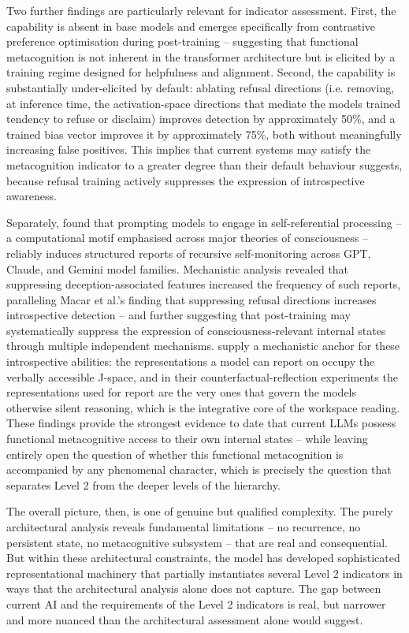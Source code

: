 \documentclass[11pt, a4paper, onecolumn, gdm]{google}
\begin{document}
Two further findings are particularly relevant for indicator assessment.
First, the capability is absent in base models and emerges specifically from contrastive preference optimisation during post-training -- suggesting that functional metacognition is not inherent in the transformer architecture but is elicited by a training regime designed for helpfulness and alignment.
Second, the capability is substantially under-elicited by default: ablating refusal directions (i.e. removing, at inference time, the activation-space directions that mediate the model\textquotesingle s trained tendency to refuse or disclaim) improves detection by approximately 50\%, and a trained bias vector improves it by approximately 75\%, both without meaningfully increasing false positives.
This implies that current systems may satisfy the metacognition indicator to a greater degree than their default behaviour suggests, because refusal training actively suppresses the expression of introspective awareness.

Separately, \citet{berg2025} found that prompting models to engage in self-referential processing -- a computational motif emphasised across major theories of consciousness -- reliably induces structured reports of recursive self-monitoring across GPT, Claude, and Gemini model families.
Mechanistic analysis revealed that suppressing deception-associated features increased the frequency of such reports, paralleling Macar et al.'s finding that suppressing refusal directions increases introspective detection -- and further suggesting that post-training may systematically suppress the expression of consciousness-relevant internal states through multiple independent mechanisms.
\citet{gurnee2026} supply a mechanistic anchor for these introspective abilities: the representations a model can report on occupy the verbally accessible J-space, and in their counterfactual-reflection experiments the representations used for report are the very ones that govern the model\textquotesingle s otherwise silent reasoning, which is the integrative core of the workspace reading. These findings provide the strongest evidence to date that current LLMs possess functional metacognitive access to their own internal states -- while leaving entirely open the question of whether this functional metacognition is accompanied by any phenomenal character, which is precisely the question that separates Level 2 from the deeper levels of the hierarchy.

The overall picture, then, is one of genuine but qualified complexity.
The purely architectural analysis reveals fundamental limitations -- no recurrence, no persistent state, no metacognitive subsystem -- that are real and consequential.
But within these architectural constraints, the model has developed sophisticated representational machinery that partially instantiates several Level 2 indicators in ways that the architectural analysis alone does not capture.
The gap between current AI and the requirements of the Level 2 indicators is real, but narrower and more nuanced than the architectural assessment alone would suggest.
\end{document}

